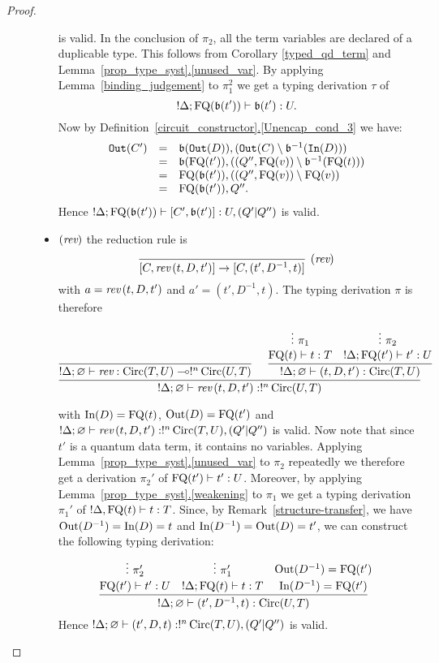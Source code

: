 \documentclass[twoside]{article}
\begin{document}
\begin{proof}
\begin{description}
\begin{itemize}
\[  \] 
  is valid. In the conclusion of $\pi_2$, all the 
  term variables are declared of a duplicable type. This 
  follows from Corollary \ref{typed_qd_term} and 
  Lemma~\hyperref[unused_var]{\ref*{prop_type_syst}.\ref*{unused_var}}. 
  By applying Lemma~\hyperref[binding_judgement]{\ref*{binding_judgement}} 
  to $\pi_1^2$ we get a typing derivation $\tau$ of 
  \[
  !\Delta;\mathop{\textrm{FQ}}\nolimits(\mathfrak{b}(t'))\vdash \mathfrak{b}(t'):U.
  \]
  Now by 
  Definition~\hyperref[Unencap_cond_3]{\ref*{circuit_constructor}.\ref*{Unencap_cond_3}} 
  we have:
  \[
  \begin{array}{rcl}
  \mathtt{Out}(C') & = & \mathfrak{b}(\mathtt{Out}(D)), (\mathtt{Out}(C)\setminus\mathfrak{b}^{-1}(\mathtt{In}(D))) \\
                   & = & \mathfrak{b}(\mathop{\textrm{FQ}}\nolimits(t')) , ((Q'',\mathop{\textrm{FQ}}\nolimits(v))\setminus \mathfrak{b}^{-1}(\mathop{\textrm{FQ}}\nolimits(t))) \\
                   & = & \mathop{\textrm{FQ}}\nolimits(\mathfrak{b}(t')) , ((Q'',\mathop{\textrm{FQ}}\nolimits(v))\setminus \mathop{\textrm{FQ}}\nolimits(v)) \\
                   & = & \mathop{\textrm{FQ}}\nolimits(\mathfrak{b}(t')),Q''.                   
  \end{array}
  \]
  Hence $!\Delta; \mathop{\textrm{FQ}}\nolimits(\mathfrak{b}(t'))\vdash [C',\mathfrak{b}(t')] :U,(Q'|Q'')$  is valid.
  \item $(\mathop{\textit{rev}}\nolimits)$ the reduction rule is
  \[
    \infer[(\rev)]{[C,\rev\,(t,D,t')]\to [C,(t',D^{-1},t)]}{}
  \]
  with $a=\mathop{\textit{rev}}\nolimits\,(t,D,t')$ and $a'=(t',D^{-1},t)$. The typing derivation $\pi$ 
  is therefore
  \begin{footnotesize}
  \[
  \infer[]{!\Delta;\varnothing\entails \rev\,(t,D,t'):!^n\Circ(U,T)}{
    \infer[]{!\Delta;\varnothing \entails \rev:\Circ(T,U)\loli !^n\Circ(U,T)}{
    }   
    &
    \infer[]{!\Delta ;\varnothing\entails (t,D,t'):\Circ(T,U)}{
      \deduce[]{\FQ(t)\entails t:T}{
        \vdots ~\pi_1
      }
      &
      \deduce[]{!\Delta;\FQ(t')\entails t':U}{
        \vdots ~\pi_2     
      }
    }
  }
  \]
  \end{footnotesize}  
  with $\mathop{\textrm{In}}\nolimits(D)=\mathop{\textrm{FQ}}\nolimits(t)$, $\mathop{\textrm{Out}}\nolimits(D)=\mathop{\textrm{FQ}}\nolimits(t')$ and 
  $!\Delta;\varnothing\vdash \mathop{\textit{rev}}\nolimits\,(t,D,t'):!^n\mathop{\textrm{Circ}}\nolimits(T,U),(Q'|Q'')$ is 
  valid. Now note that since $t'$ is a quantum data term, it contains no variables. 
  Applying Lemma~\hyperref[unused_var]{\ref*{prop_type_syst}.\ref*{unused_var}} 
  to $\pi_2$ repeatedly we therefore get a derivation $\pi_2'$ of 
  $\mathop{\textrm{FQ}}\nolimits(t')\vdash t':U$. Moreover, by applying
  Lemma~\hyperref[weakening]{\ref*{prop_type_syst}.\ref*{weakening}} to $\pi_1$ 
  we get a typing derivation $\pi_1'$ of $!\Delta ,\mathop{\textrm{FQ}}\nolimits(t)\vdash t:T$.
  Since, by 
  Remark~\hyperref[structure-transfer]{\ref*{structure-transfer}}, 
  we have $\mathop{\textrm{Out}}\nolimits(D^{-1})=\mathop{\textrm{In}}\nolimits(D)=t$ and $\mathop{\textrm{In}}\nolimits(D^{-1})=\mathop{\textrm{Out}}\nolimits(D)=t'$, we can construct 
  the following typing derivation:
  \[
  \infer[]{!\Delta ;\varnothing\entails (t',D^{-1},t):\Circ(U,T)}{
    \deduce[]{\FQ(t')\entails t':U}{
      \vdots ~\pi_2'
    }
    &
    \deduce[]{!\Delta;\FQ(t)\entails t:T}{
      \vdots ~\pi_1'     
    }
    &
    \deduce[]{\In(D^{-1})=\FQ(t')}{
      \Out(D^{-1})=\FQ(t')
    }
  }  
  \]
  Hence $!\Delta;\varnothing\vdash (t',D,t):!^n\mathop{\textrm{Circ}}\nolimits(T,U),(Q'|Q'')$ 
  is valid.    
\end{itemize}
\end{description}
\end{proof}
\end{document}
